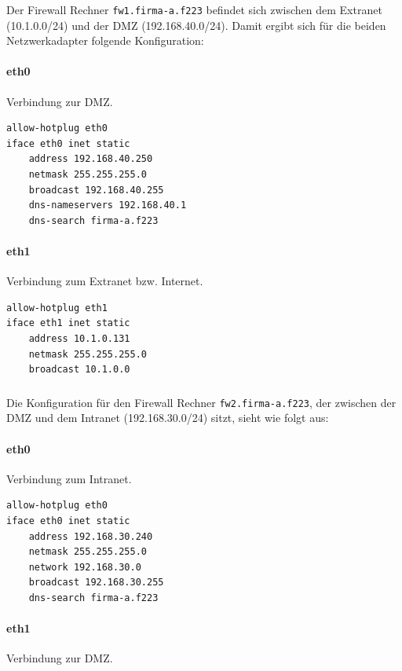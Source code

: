 Der Firewall Rechner {\tt fw1.firma-a.f223} befindet sich zwischen dem Extranet
(10.1.0.0/24) und der DMZ (192.168.40.0/24).
Damit ergibt sich für die beiden Netzwerkadapter folgende Konfiguration:

\paragraph{eth0} Verbindung zur DMZ.

\begin{lstlisting}[label=lst:fw1:eth0,caption={Netzwerkadapter eth0 Konfiguration.}]
allow-hotplug eth0
iface eth0 inet static
    address 192.168.40.250
    netmask 255.255.255.0
    broadcast 192.168.40.255
    dns-nameservers 192.168.40.1
    dns-search firma-a.f223
\end{lstlisting}

\paragraph{eth1} Verbindung zum Extranet bzw. Internet.

\begin{lstlisting}[label=lst:fw1:eth1,caption={Netzwerkadapter eth1 Konfiguration.}]
allow-hotplug eth1
iface eth1 inet static
    address 10.1.0.131
    netmask 255.255.255.0
    broadcast 10.1.0.0
\end{lstlisting}


\subsubsection{\fwb}

Die Konfiguration für den Firewall Rechner {\tt fw2.firma-a.f223}, der zwischen
der DMZ und dem Intranet (192.168.30.0/24) sitzt, sieht wie folgt aus:

\paragraph{eth0} Verbindung zum Intranet.

\begin{lstlisting}[label=lst:fw2:eth0,caption={Netzwerkadapter eth0 Konfiguration.}]
allow-hotplug eth0
iface eth0 inet static
    address 192.168.30.240
    netmask 255.255.255.0
    network 192.168.30.0
    broadcast 192.168.30.255
    dns-search firma-a.f223
\end{lstlisting}

\paragraph{eth1} Verbindung zur DMZ.

